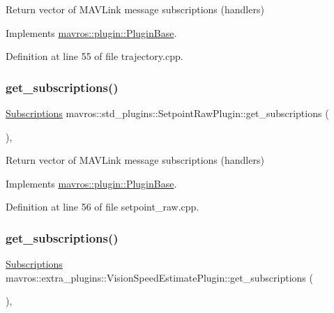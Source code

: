 Return vector of M\+A\+V\+Link message subscriptions (handlers) 



Implements \mbox{\hyperlink{group__plugin_gaf4e23fec6d7436a62cbf0942a2e5791c}{mavros\+::plugin\+::\+Plugin\+Base}}.



Definition at line 55 of file trajectory.\+cpp.

\mbox{\label{group__plugin_ga7010ce8f4de96dae39a8dd9a0de4246e}} 
\subsubsection{\texorpdfstring{get\_subscriptions()}{get\_subscriptions()}\hspace{0.1cm}{\footnotesize\ttfamily [19/41]}}
{\footnotesize\ttfamily \mbox{\hyperlink{group__plugin_ga8967d61fc77040e0c3ea5a4585d62a09}{Subscriptions}} mavros\+::std\+\_\+plugins\+::\+Setpoint\+Raw\+Plugin\+::get\+\_\+subscriptions (\begin{DoxyParamCaption}{ }\end{DoxyParamCaption})\hspace{0.3cm}{\ttfamily [inline]}, {\ttfamily [virtual]}}



Return vector of M\+A\+V\+Link message subscriptions (handlers) 



Implements \mbox{\hyperlink{group__plugin_gaf4e23fec6d7436a62cbf0942a2e5791c}{mavros\+::plugin\+::\+Plugin\+Base}}.



Definition at line 56 of file setpoint\+\_\+raw.\+cpp.

\mbox{\label{group__plugin_gaf84b1b053a36a50e34346d397033dada}} 
\subsubsection{\texorpdfstring{get\_subscriptions()}{get\_subscriptions()}\hspace{0.1cm}{\footnotesize\ttfamily [20/41]}}
{\footnotesize\ttfamily \mbox{\hyperlink{group__plugin_ga8967d61fc77040e0c3ea5a4585d62a09}{Subscriptions}} mavros\+::extra\+\_\+plugins\+::\+Vision\+Speed\+Estimate\+Plugin\+::get\+\_\+subscriptions (\begin{DoxyParamCaption}{ }\end{DoxyParamCaption})\hspace{0.3cm}{\ttfamily [inline]}, {\ttfamily [virtual]}}



